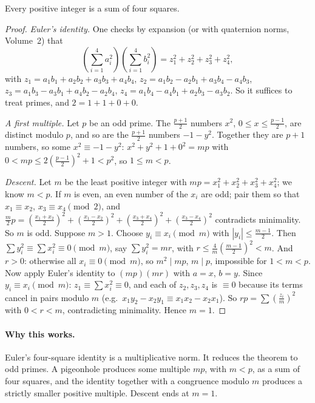 \begin{theorem}[Lagrange, 1770]\label{thm:foursq}
Every positive integer is a sum of four squares.
\end{theorem}
\begin{proof}
\emph{Euler's identity.} One checks by expansion (or with quaternion norms, Volume~2) that
\[
\left(\sum_{i=1}^4a_i^2\right)\left(\sum_{i=1}^4b_i^2\right)=z_1^2+z_2^2+z_3^2+z_4^2,
\]
with $z_1=a_1b_1+a_2b_2+a_3b_3+a_4b_4$, $z_2=a_1b_2-a_2b_1+a_3b_4-a_4b_3$, $z_3=a_1b_3-a_3b_1+a_4b_2-a_2b_4$, $z_4=a_1b_4-a_4b_1+a_2b_3-a_3b_2$. So it suffices to treat primes, and $2=1+1+0+0$.

\emph{A first multiple.} Let $p$ be an odd prime. The $\frac{p+1}2$ numbers $x^2$, $0\le x\le\frac{p-1}2$, are distinct modulo $p$, and so are the $\frac{p+1}2$ numbers $-1-y^2$. Together they are $p+1$ numbers, so some $x^2\equiv-1-y^2$: $x^2+y^2+1+0^2=mp$ with $0<mp\le2\left(\frac{p-1}2\right)^2+1<p^2$, so $1\le m<p$.

\emph{Descent.} Let $m$ be the least positive integer with $mp=x_1^2+x_2^2+x_3^2+x_4^2$; we know $m<p$. If $m$ is even, an even number of the $x_i$ are odd; pair them so that $x_1\equiv x_2$, $x_3\equiv x_4\pmod2$, and $\frac m2p=\left(\frac{x_1+x_2}2\right)^2+\left(\frac{x_1-x_2}2\right)^2+\left(\frac{x_3+x_4}2\right)^2+\left(\frac{x_3-x_4}2\right)^2$ contradicts minimality. So $m$ is odd. Suppose $m>1$. Choose $y_i\equiv x_i\pmod m$ with $|y_i|\le\frac{m-1}2$. Then $\sum y_i^2\equiv\sum x_i^2\equiv0\pmod m$, say $\sum y_i^2=mr$, with $r\le\frac{4}{m}\left(\frac{m-1}2\right)^2<m$. And $r>0$: otherwise all $x_i\equiv0\pmod m$, so $m^2\mid mp$, $m\mid p$, impossible for $1<m<p$.
Now apply Euler's identity to $(mp)(mr)$ with $a=x$, $b=y$. Since $y_i\equiv x_i\pmod m$: $z_1\equiv\sum x_i^2\equiv0$, and each of $z_2,z_3,z_4$ is $\equiv0$ because its terms cancel in pairs modulo $m$ (e.g.\ $x_1y_2-x_2y_1\equiv x_1x_2-x_2x_1$). So $rp=\sum\left(\frac{z_i}m\right)^2$ with $0<r<m$, contradicting minimality. Hence $m=1$.
\end{proof}

\paragraph{Why this works.}
Euler's four-square identity is a multiplicative norm. It reduces the theorem to odd primes. A pigeonhole produces some multiple $mp$, with $m<p$, as a sum of four squares, and the identity together with a congruence modulo $m$ produces a strictly smaller positive multiple. Descent ends at $m=1$.

